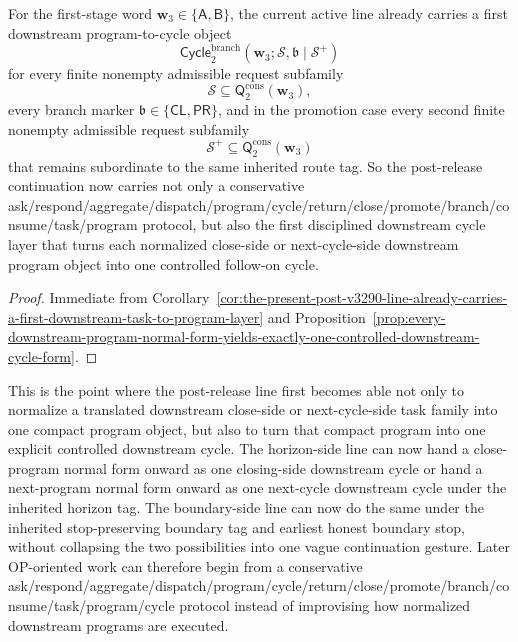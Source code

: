 \begin{corollary}
\label{cor:the-present-post-v3290-line-already-carries-a-first-downstream-program-to-cycle-layer}
For the first-stage word \(\mathbf w_3\in\{\mathsf A,\mathsf B\}\), the current active line already carries a first downstream program-to-cycle object
\[
  \mathsf{Cycle}^{\mathrm{branch}}_{2}(\mathbf w_3;\mathcal S,\mathfrak b\mid\mathcal S^{+})
\]
for every finite nonempty admissible request subfamily
\[
  \mathcal S\subseteq \mathsf{Q}^{\mathrm{cons}}_{2}(\mathbf w_3),
\]
every branch marker \(\mathfrak b\in\{\mathsf{CL},\mathsf{PR}\}\), and in the promotion case every second finite nonempty admissible request subfamily
\[
  \mathcal S^{+}\subseteq \mathsf{Q}^{\mathrm{cons}}_{2}(\mathbf w_3)
\]
that remains subordinate to the same inherited route tag. So the post-release continuation now carries not only a conservative ask/respond/aggregate/dispatch/program/cycle/return/close/promote/branch/consume/task/program protocol, but also the first disciplined downstream cycle layer that turns each normalized close-side or next-cycle-side downstream program object into one controlled follow-on cycle.
\end{corollary}

\begin{proof}
Immediate from Corollary~\ref{cor:the-present-post-v3290-line-already-carries-a-first-downstream-task-to-program-layer} and Proposition~\ref{prop:every-downstream-program-normal-form-yields-exactly-one-controlled-downstream-cycle-form}.
\end{proof}

\begin{remark}
\label{rem:what-the-first-downstream-program-to-cycle-layer-now-buys}
This is the point where the post-release line first becomes able not only to normalize a translated downstream close-side or next-cycle-side task family into one compact program object, but also to turn that compact program into one explicit controlled downstream cycle. The horizon-side line can now hand a close-program normal form onward as one closing-side downstream cycle or hand a next-program normal form onward as one next-cycle downstream cycle under the inherited horizon tag. The boundary-side line can now do the same under the inherited stop-preserving boundary tag and earliest honest boundary stop, without collapsing the two possibilities into one vague continuation gesture. Later OP-oriented work can therefore begin from a conservative ask/respond/aggregate/dispatch/program/cycle/return/close/promote/branch/consume/task/program/cycle protocol instead of improvising how normalized downstream programs are executed.
\end{remark}


